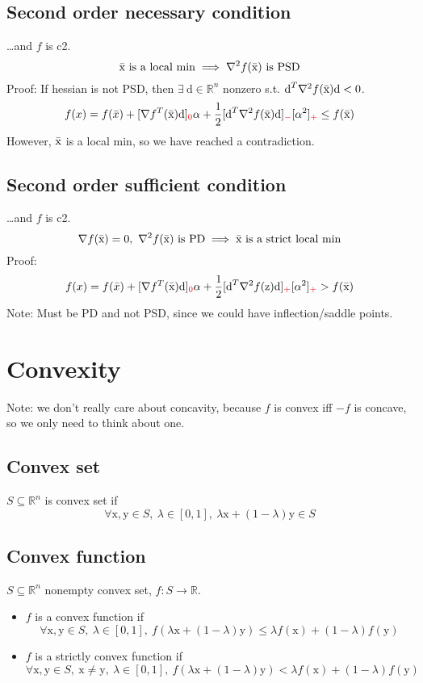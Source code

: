 \documentclass[6pt]{article}
\def\x{\textrm{x}}
\def\y{\textrm{y}}
\def\z{\textrm{z}}
\def\d{\textrm{d}}
\begin{document}
\subsection{Second order necessary condition}
\ldots and $f$ is c2.
$$\Bar{\x} \textrm{ is a local min}\implies \nabla^2 f(\Bar{\x}) \textrm{ is PSD}$$
Proof: If hessian is not PSD, then $\exists ~\d \in \mathbb{R}^n$ nonzero s.t. $\d^T\nabla^2 f(\Bar{\x})\d < 0$.
$$f(x) = f(\Bar{x}) + [\nabla f^T(\Bar{\x})\d]_{\color{red}0}\alpha + \frac{1}{2}[\d^T \nabla^2 f(\Bar{\x})\d]_{\color{red}-}[\alpha^2]_{\color{red} +} \leq f(\Bar{\x})$$
However, $\Bar{\x}$ is a local min, so we have reached a contradiction.

\subsection{Second order sufficient condition}
\ldots and $f$ is c2.
$$\nabla f(\Bar{\x})=0,~\nabla^2 f(\Bar{\x}) \textrm{ is PD}\implies \Bar{\x} \textrm{ is a strict local min}$$
Proof:
$$f(x) = f(\Bar{x}) + [\nabla f^T(\Bar{\x})\d]_{\color{red}0}\alpha + \frac{1}{2}[\d^T \nabla^2 f(\z)\d]_{\color{red}+}[\alpha^2]_{\color{red} +} > f(\Bar{\x})$$
Note: Must be PD and not PSD, since we could have inflection/saddle points.

\section{Convexity}
Note: we don't really care about concavity, because $f$ is convex iff $-f$ is concave, so we only need to think about one.
\subsection{Convex set}
$S\subseteq \mathbb{R}^n$ is convex set if
$$\forall \x,\y \in S,~\lambda\in[0,1],~ \lambda \x + (1-\lambda)\y \in S $$
\subsection{Convex function}
$S\subseteq \mathbb{R}^n$ nonempty convex set, $f:S\to \mathbb{R}$. 
\begin{itemize}
    \item $f$ is a convex function if
$$\forall \x,\y \in S,~\lambda\in[0,1],~ f(\lambda \x + (1-\lambda)\y) \leq \lambda f(\x) + (1-\lambda) f(\y)$$
    \item $f$ is a strictly convex function if 
    $$\forall \x,\y \in S,~\x \neq \y,~ \lambda\in[0,1],~ f(\lambda \x + (1-\lambda)\y) < \lambda f(\x) + (1-\lambda) f(\y)$$
\end{itemize}
\end{document}
